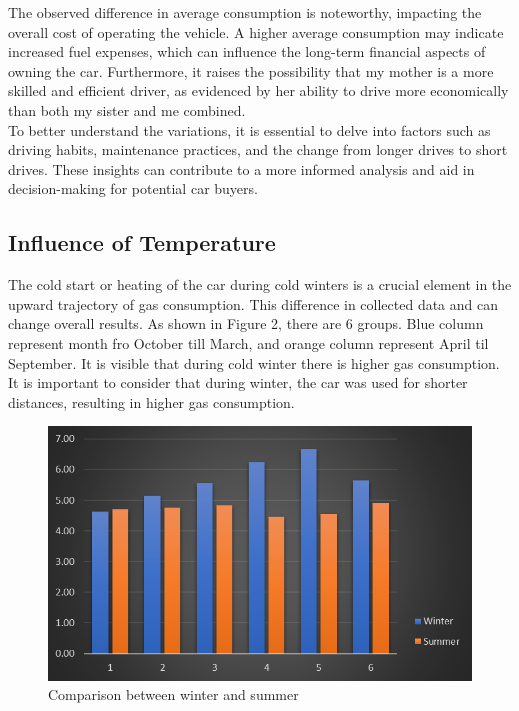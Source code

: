 \documentclass[10pt,a4paper]{article}
\begin{document}
The observed difference in average consumption is noteworthy, impacting the overall cost of operating the vehicle. A higher average consumption may indicate increased fuel expenses, which can influence the long-term financial aspects of owning the car. Furthermore, it raises the possibility that my mother is a more skilled and efficient driver, as evidenced by her ability to drive more economically than both my sister and me combined.
\\
To better understand the variations, it is essential to delve into factors such as driving habits, maintenance practices, and the change from longer drives to short drives. These insights can contribute to a more informed analysis and aid in decision-making for potential car buyers.

\subsection{Influence of Temperature}

The cold start or heating of the car during cold winters is a crucial element in the upward trajectory of gas consumption.\cite{zhu2021effects} This difference in collected data and can change overall results. As shown in Figure 2, there are 6 groups. Blue column represent month fro October till March, and orange column represent April til September. It is visible that during cold winter there is higher gas consumption.\\It is important to consider that during winter, the car was used for shorter distances, resulting in higher gas consumption.

\begin{figure}[htbp]
  \centering
  \includegraphics[width=1\linewidth]{Comparison.png}
  \caption{Comparison between winter and summer}
  \label{Figure 2}
\end{figure}
\end{document}
